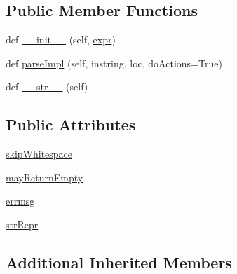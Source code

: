 \subsection*{Public Member Functions}
\begin{DoxyCompactItemize}
\item 
def \hyperlink{classpyparsing_1_1NotAny_a3880c985fe2b130fd6b215179812129a}{\+\_\+\+\_\+init\+\_\+\+\_\+} (self, \hyperlink{classpyparsing_1_1ParseElementEnhance_a0139048279aeac38804a10d131d3c340}{expr})
\item 
def \hyperlink{classpyparsing_1_1NotAny_ab9421adea485cd8aec4c9f704c049b20}{parse\+Impl} (self, instring, loc, do\+Actions=True)
\item 
def \hyperlink{classpyparsing_1_1NotAny_ae135c344fa1030fedcaf935cf300c632}{\+\_\+\+\_\+str\+\_\+\+\_\+} (self)
\end{DoxyCompactItemize}
\subsection*{Public Attributes}
\begin{DoxyCompactItemize}
\item 
\hyperlink{classpyparsing_1_1NotAny_add822c84949387363a5f47438bb2b26f}{skip\+Whitespace}
\item 
\hyperlink{classpyparsing_1_1NotAny_a4385e126d0a9e68ed274d8ab82fef004}{may\+Return\+Empty}
\item 
\hyperlink{classpyparsing_1_1NotAny_a9137820d612b9167eda7d53b81f7c683}{errmsg}
\item 
\hyperlink{classpyparsing_1_1NotAny_a756a74517c8c7189707612926414bcce}{str\+Repr}
\end{DoxyCompactItemize}
\subsection*{Additional Inherited Members}



